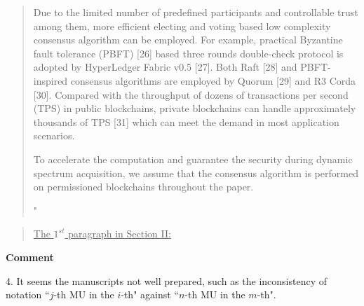\documentclass[12pt,draftcls, onecolumn]{IEEEtran}
\begin{document}
\begin{quote}
{{\hspace{0.15in} Due to the limited number of predefined participants and controllable trust among them, more efficient electing and voting based low complexity consensus algorithm can be employed. For example,  practical Byzantine fault tolerance (PBFT) [26] based three rounds double-check protocol is adopted by HyperLedger Fabric v0.5 [27]. Both Raft [28] and PBFT-inspired consensus algorithms are employed by Quorum [29] and R3 Corda [30]. Compared with the throughput of dozens of transactions per second (TPS) in public blockchains, private blockchains can handle approximately thousands of TPS [31] which can meet the demand in most application scenarios.

\hspace{0.15in} To accelerate the computation and guarantee the security during dynamic spectrum acquisition, we assume that the consensus algorithm is performed on permissioned blockchains throughout the paper.}"}
\end{quote}

\begin{quote}
\underline{The $1^{st}$ paragraph in Section II:}
\vspace{0mm}
\end{quote}

\vspace{3mm}
\noindent\textcolor[rgb]{1.00,0.00,0.00}{\textbf{Comment}}
\vspace{3mm}


4. It seems the manuscripts not well prepared, such as the inconsistency of notation ``$j$-th MU in the $i$-th" against ``$n$-th MU in the $m$-th".
\end{document}
